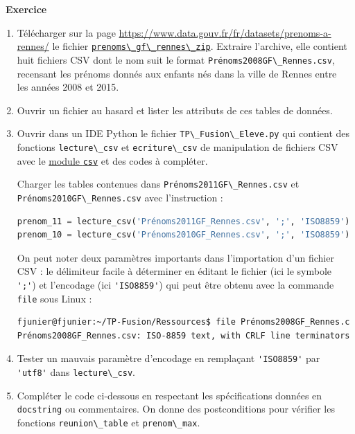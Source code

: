 \documentclass[
  11pt,
]{article}
\newcommand{\passthrough}[1]{#1}
\newcounter{exo}
\newenvironment{exercice}[1]
{\par \medskip   \addtocounter{exo}{1} \noindent  
\begin{bclogo}[arrondi =0.1,   noborder = true, logo=\bccrayon, marge=4]{~\textbf{Exercice} \textbf{\theexo} {\itshape #1} }  \par}
{
\end{bclogo}
 \par \bigskip }
\newcounter{def}
\begin{document}
\begin{exercice}{}

\begin{enumerate}
\def\labelenumi{\arabic{enumi}.}
\item
  Télécharger sur la page
  \url{https://www.data.gouv.fr/fr/datasets/prenoms-a-rennes/} le
  fichier
  \href{https://www.data.gouv.fr/fr/datasets/r/4b1b72d6-7238-4bda-a5de-ebd72cb058a0}{\passthrough{\lstinline!prenoms\_gf\_rennes\_zip!}}.
  Extraire l'archive, elle contient huit fichiers CSV dont le nom suit
  le format \passthrough{\lstinline!Prénoms2008GF\_Rennes.csv!},
  recensant les prénoms donnés aux enfants nés dans la ville de Rennes
  entre les années 2008 et 2015.
\item
  Ouvrir un fichier au hasard et lister les attributs de ces tables de
  données.
\item
  Ouvrir dans un IDE Python le fichier
  \passthrough{\lstinline!TP\_Fusion\_Eleve.py!} qui contient des
  fonctions \passthrough{\lstinline!lecture\_csv!} et
  \passthrough{\lstinline!ecriture\_csv!} de manipulation de fichiers
  CSV avec le
  \href{https://docs.python.org/fr/3/library/csv.html}{module
  \passthrough{\lstinline!csv!}} et des codes à compléter.

  Charger les tables contenues dans
  \passthrough{\lstinline!Prénoms2011GF\_Rennes.csv!} et
  \passthrough{\lstinline!Prénoms2010GF\_Rennes.csv!} avec l'instruction
  :

\begin{lstlisting}[language=Python]
prenom_11 = lecture_csv('Prénoms2011GF_Rennes.csv', ';', 'ISO8859')
prenom_10 = lecture_csv('Prénoms2010GF_Rennes.csv', ';', 'ISO8859')
\end{lstlisting}

  On peut noter deux paramètres importants dans l'importation d'un
  fichier CSV : le délimiteur facile à déterminer en éditant le fichier
  (ici le symbole \passthrough{\lstinline!';'!}) et l'encodage (ici
  \passthrough{\lstinline!'ISO8859'!}) qui peut être obtenu avec la
  commande \passthrough{\lstinline!file!} sous Linux :

\begin{lstlisting}[language=bash]
fjunier@fjunier:~/TP-Fusion/Ressources$ file Prénoms2008GF_Rennes.csv 
Prénoms2008GF_Rennes.csv: ISO-8859 text, with CRLF line terminators
\end{lstlisting}
\item
  Tester un mauvais paramètre d'encodage en remplaçant
  \passthrough{\lstinline!'ISO8859'!} par
  \passthrough{\lstinline!'utf8'!} dans
  \passthrough{\lstinline!lecture\_csv!}.
\item
  Compléter le code ci-dessous en respectant les spécifications données
  en \passthrough{\lstinline!docstring!} ou commentaires. On donne des
  postconditions pour vérifier les fonctions
  \passthrough{\lstinline!reunion\_table!} et
  \passthrough{\lstinline!prenom\_max!}.
\end{enumerate}


\end{exercice}
\end{document}

